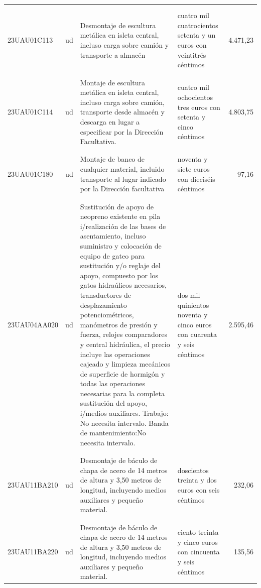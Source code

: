 \begin{supertabular}{|l|l|p{5cm}|p{3cm}|r|}
&&&&\\%
&&&&\\%
23UAU01C113&ud&Desmontaje de escultura metálica en isleta central, incluso carga sobre camión y transporte a almacén&cuatro mil cuatrocientos setenta y un euros con veintitrés céntimos&4.471,23\\%
&&&&\\%
&&&&\\%
23UAU01C114&ud&Montaje de escultura metálica en isleta central, incluso carga sobre camión, transporte desde almacén y descarga en lugar a especificar por la Dirección Facultativa.&cuatro mil ochocientos tres euros con setenta y cinco céntimos&4.803,75\\%
&&&&\\%
&&&&\\%
23UAU01C180&ud&Montaje de banco de cualquier material, incluido transporte al lugar indicado por la Dirección facultativa&noventa y siete euros con dieciséis céntimos&97,16\\%
&&&&\\%
&&&&\\%
23UAU04AA020&ud&Sustitución de apoyo de neopreno existente en pila i/realización de las bases de asentamiento, incluso suministro y colocación de equipo de gateo para sustitución y/o reglaje del apoyo, compuesto por los gatos hidraúlicos necesarios, transductores de desplazamiento potenciométricos, manómetros de presión y fuerza, relojes comparadores y central hidráulica, el precio incluye las operaciones cajeado y limpieza mecánicos de superficie de hormigón y todas las operaciones necesarias para la completa sustitución del apoyo, i/medios auxiliares. Trabajo: No necesita intervalo. Banda de mantenimiento:No necesita intervalo.&dos mil quinientos noventa y cinco euros con cuarenta y seis céntimos&2.595,46\\%
&&&&\\%
&&&&\\%
23UAU11BA210&ud&Desmontaje de báculo de chapa de acero de 14 metros de altura y 3,50 metros de longitud, incluyendo medios auxiliares y pequeño material.&doscientos treinta y dos euros con seis céntimos&232,06\\%
&&&&\\%
&&&&\\%
23UAU11BA220&ud&Desmontaje de báculo de chapa de acero de 14 metros de altura y 3,50 metros de longitud, incluyendo medios auxiliares y pequeño material.&ciento treinta y cinco euros con cincuenta y seis céntimos&135,56\\%

\end{supertabular}
